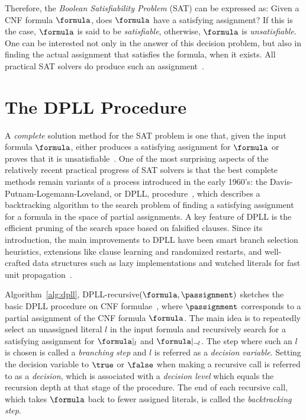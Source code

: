 Therefore, the \emph{Boolean Satisfiability Problem} (SAT) can be expressed as:
Given a CNF formula $\formula$, does $\formula$ have a satisfying assignment? If
this is the case, $\formula$ is said to be \emph{satisfiable}, otherwise,
$\formula$ is \emph{unsatisfiable}.  One can be interested not only in the
answer of this decision problem, but also in finding the actual assignment that
satisfies the formula, when it exists. All practical SAT solvers do produce such
an assignment~\cite{cormen}. 

\section{The DPLL Procedure}%
\label{sec:dpll}

A \emph{complete} solution method for the SAT problem is one that, given the
input formula $\formula$, either produces a satisfying assignment for $\formula$
or proves that it is unsatisfiable~\cite{satchapter}. One of the most surprising
aspects of the relatively recent practical progress of SAT solvers is that the
best complete methods remain variants of a process introduced in the early
1960’s: the Davis-Putnam-Logemann-Loveland, or DPLL,
procedure~\cite{DavisLongemannLoveland:1962}, which describes a backtracking
algorithm to the search problem of finding a satisfying assignment for a formula in
the space of partial assignments. A key feature of DPLL is the efficient pruning of
the search space based on falsified clauses. Since its introduction, the main
improvements to DPLL have been smart branch selection heuristics, extensions
like clause learning and randomized restarts, and well-crafted data structures
such as lazy implementations and watched literals for fast unit
propagation~\cite{satchapter}.

Algorithm~\ref{alg:dpll}, DPLL-recursive$(\formula, \passignment)$ sketches the
basic DPLL procedure on CNF formulae~\cite{DavisLongemannLoveland:1962}, where
$\passignment$ corresponds to a partial assignment of the CNF formula
$\formula$. The main idea is to repeatedly select an unassigned literal $l$ in
the input formula and recursively search for a satisfying assignment for
$\formula|_l$ and $\formula|_{\neg l}$. The step where such an $l$ is chosen is
called a \emph{branching step} and $l$ is referred as a \emph{decision
variable}. Setting the decision variable to $\true$ or $\false$ when making a
recursive call is referred to as a \emph{decision}, which is associated with a
\emph{decision level} which equals the recursion depth at that stage of the
procedure. The end of each recursive call, which takes $\formula$ back to fewer
assigned literals, is called the \emph{backtracking step}.

